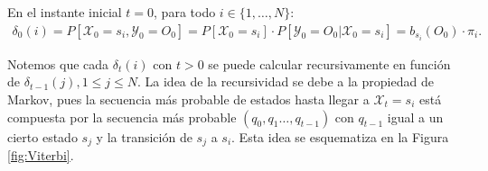 En el instante inicial $t=0$, para todo $i\in\{1,\dots,N\}$:
\[
\begin{aligned}
    \delta_0(i)=P[\mathcal{X}_0=s_i,\mathcal{Y}_0=O_0]=P[\mathcal{X}_0=s_i]\cdot P[\mathcal{Y}_0=O_0|\mathcal{X}_0=s_i]=b_{s_i}(O_0)\cdot\pi_i.
\end{aligned}
\]

Notemos que cada $\delta_t(i)$ con $t>0$ se puede calcular recursivamente en función de $\delta_{t-1}(j),1\leq j\leq N$. La idea de la recursividad se debe a la propiedad de Markov, pues la secuencia más probable de estados hasta llegar a $\mathcal{X}_t=s_i$ está compuesta por la secuencia más probable $(q_0,q_1\dots,q_{t-1})$ con $q_{t-1}$ igual a un cierto estado $s_j$ y la transición de $s_j$ a $s_i$. Esta idea se esquematiza en la Figura \ref{fig:Viterbi}. 

